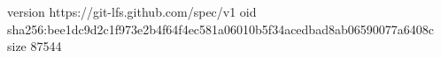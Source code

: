 version https://git-lfs.github.com/spec/v1
oid sha256:bee1dc9d2c1f973e2b4f64f4ec581a06010b5f34acedbad8ab06590077a6408c
size 87544
